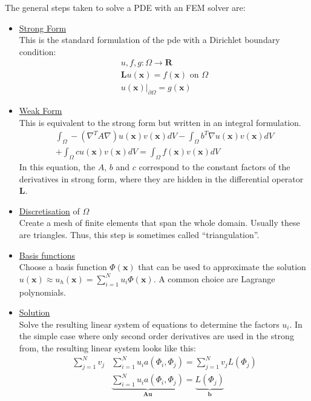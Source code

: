 \documentclass[./\jobname.tex]{subfiles}
\begin{document}
The general steps taken to solve a PDE with an FEM solver are: 
\begin{itemize}
	\item \underline{Strong Form} \\
		  This is the standard formulation of the \gls{pde} with a Dirichlet boundary condition: \\
		  \begin{equation}
			  \begin{split}
			  	u, f, g: \Omega \rightarrow \mathbf{R} \\
				\mathbf{L} u(\mathbf{x}) = f(\mathbf{x}) \text{ on $\Omega$} \\
				u(\mathbf{x})|_{\partial \Omega} = g(\mathbf{x})
			  \end{split}
		  \end{equation}
	\item \underline{Weak Form} \\
		  This is equivalent to the strong form but written in an integral formulation. \\
		  \begin{equation}
			  \begin{split}
			      \int_{\Omega} - (\nabla^T A \nabla) u(\mathbf{x}) v(\mathbf{x}) dV - \int_{\Omega} b^T \nabla u(\mathbf{x}) v(\mathbf{x}) dV \\
			      + \int_{\Omega} c u(\mathbf{x}) v(\mathbf{x}) dV = \int_{\Omega} f(\mathbf{x}) v(\mathbf{x}) dV
			  \end{split}
		  \end{equation}
		  In this equation, the $A$, $b$ and $c$ correspond to the constant factors of the derivatives in strong form, where they are hidden in the differential operator $\mathbf{L}$.
	\item \underline{Discretisation} of $\Omega$ \\
		  Create a mesh of finite elements that span the whole domain. Usually these are triangles. Thus, this step is sometimes called ``triangulation''.
	\item \underline{Basis functions} \\
		  Choose a basis function $\Phi(\mathbf{x})$ that can be used to approximate the solution $u(\mathbf{x}) \approx u_{h}(\mathbf{x}) = \sum_{i = 1}^{N} u_i \Phi(\mathbf{x})$. A common choice are Lagrange polynomials. 
	\item \underline{Solution} \\
		  Solve the resulting linear system of equations to determine the factors $u_i$. In the simple case where only second order derivatives are used in the strong from, the resulting linear system looks like this: 
		  \begin{equation}
		  \begin{split}
		  \sum_{j=1}^{N} v_j & \sum_{i=1}^{N} u_i a(\Phi_i, \Phi_j) = \sum_{j=1}^{N} v_j L(\Phi_j) \\
		  & \underbrace{\sum_{i=1}^{N} u_i a(\Phi_i, \Phi_j)}_{\mathbf{A u}} = \underbrace{L(\Phi_j)}_{\mathbf{b}}
		  \end{split}
		  \end{equation}
\end{itemize}
\end{document}
